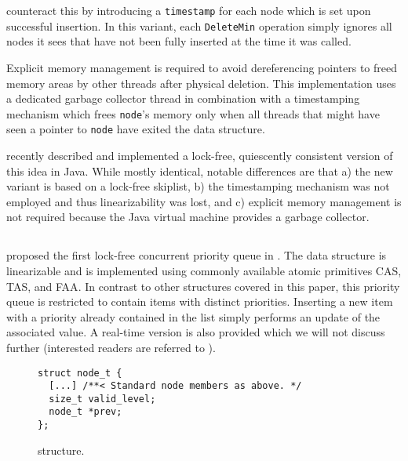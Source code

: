 \citeauthor{shavit2000skiplist} counteract this by introducing a \lstinline|timestamp| for each
node which is set upon successful insertion. In this variant, each \lstinline|DeleteMin| operation
simply ignores all nodes it sees that have not been fully inserted at the time it was called.

Explicit memory management is required to avoid dereferencing pointers to freed memory areas
by other threads after physical deletion. This implementation uses a dedicated garbage collector
thread in combination with a timestamping mechanism which frees \lstinline|node|'s memory only
when all threads that might have seen a pointer to \lstinline|node| have exited the data structure.

\citeauthor{herlihy2012art} \cite{herlihy2012art} recently described and implemented a lock-free,
quiescently consistent version of this idea in Java. While mostly identical, notable differences are
that a) the new variant is based on a lock-free skiplist, b) the timestamping mechanism was not
employed and thus linearizability was lost, and c) explicit memory management is not required
because the Java virtual machine provides a garbage collector.

\subsection{\citeauthor{sundell2003fast}} \label{sec:sundell}

\citeauthor{sundell2003fast} proposed the first lock-free concurrent priority queue in
\citeyear{sundell2003fast} \cite{sundell2003fast}. The data structure is linearizable
and is implemented using commonly available atomic primitives \ac{CAS}, \ac{TAS}, and \ac{FAA}.
In contrast to other structures covered in this paper, this priority queue is restricted to
contain items with distinct priorities. Inserting a new item with a priority already contained
in the list simply performs an update of the associated value.
A real-time version is also provided which we will not discuss further (interested readers are
referred to \cite{sundell2003fast}).

\begin{figure}[ht]
\begin{lstlisting}
struct node_t {
  [...] /**< Standard node members as above. */
  size_t valid_level;
  node_t *prev;
};
\end{lstlisting}
\caption{\citeauthor{sundell2003fast} structure.}
\label{fig:sundellsl}
\end{figure}


